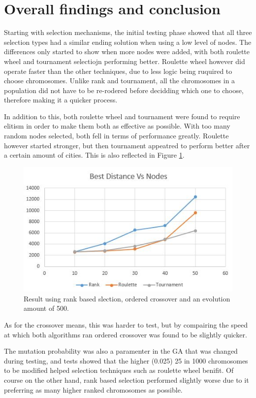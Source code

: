 \documentclass[article]{IEEEtran}
\begin{document}
\section{Overall findings and conclusion}
Starting with selection mechanisms, the initial testing phase showed that all three selection types had a similar ending solution when using a low level of nodes. The differences only started to show when more nodes were added, with both roulette wheel and tournament selectiojn performing better. Roulette wheel however did operate faster than the other techniques, due to less logic being ruquired to choose chromosomes. Unlike rank and tournament, all the chromosomes in a population did not have to be re-rodered before decidding which one to choose, therefore making it a quicker process. \par
In addition to this, both roulette wheel and tournament were found to require elitism in order to make them both as effective as possible. With too many random nodes selected, both fell in terms of performance greatly. Roulette however started stronger, but then tournament appeatred to perform better after a certain amount of cities. This is also reflected in Figure \ref{fig:20}. \par
\begin{figure}[H]
\centering
  \includegraphics[width=.8\linewidth]{images/distances}
  \caption{Result using rank based slection, ordered crossover and an evolution amount of 500.}
  \label{fig:20}
\end{figure}
As for the crossover means, this was harder to test, but by compairing the speed at which both algorithms ran ordered crossover was found to be slightly quicker. \par
The mutation probability was also a paramenter in the GA that was changed during testing, and tests showed that the higher (0.025) 25 in 1000 chromosomes to be modified helped selection techniques such as roulette wheel benifit. Of course on the other hand, rank based selection performed slightly worse due to it preferring as many higher ranked chromosomes as possible. \par
\end{document}
